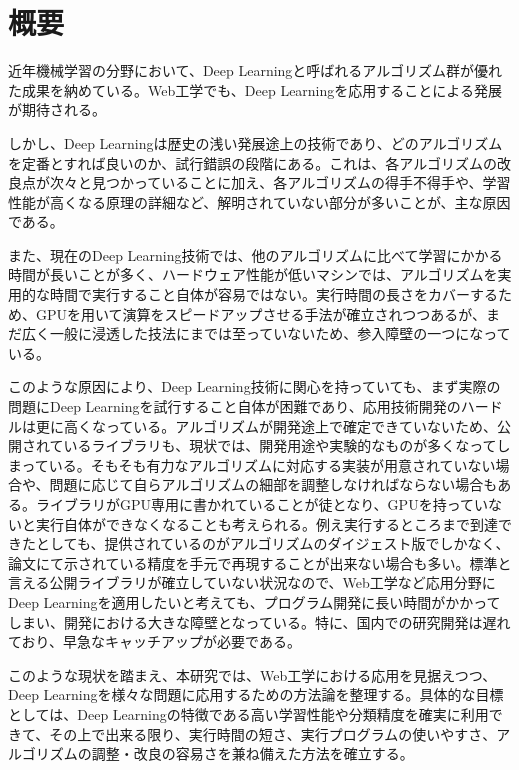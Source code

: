 \chapter*{概要}
近年機械学習の分野において、Deep Learningと呼ばれるアルゴリズム群が優れた成果を納めている。Web工学でも、Deep Learningを応用することによる発展が期待される。\par
しかし、Deep Learningは歴史の浅い発展途上の技術であり、どのアルゴリズムを定番とすれば良いのか、試行錯誤の段階にある。これは、各アルゴリズムの改良点が次々と見つかっていることに加え、各アルゴリズムの得手不得手や、学習性能が高くなる原理の詳細など、解明されていない部分が多いことが、主な原因である。\par
また、現在のDeep Learning技術では、他のアルゴリズムに比べて学習にかかる時間が長いことが多く、ハードウェア性能が低いマシンでは、アルゴリズムを実用的な時間で実行すること自体が容易ではない。実行時間の長さをカバーするため、GPUを用いて演算をスピードアップさせる手法が確立されつつあるが、まだ広く一般に浸透した技法にまでは至っていないため、参入障壁の一つになっている。\par
このような原因により、Deep Learning技術に関心を持っていても、まず実際の問題にDeep Learningを試行すること自体が困難であり、応用技術開発のハードルは更に高くなっている。アルゴリズムが開発途上で確定できていないため、公開されているライブラリも、現状では、開発用途や実験的なものが多くなってしまっている。そもそも有力なアルゴリズムに対応する実装が用意されていない場合や、問題に応じて自らアルゴリズムの細部を調整しなければならない場合もある。ライブラリがGPU専用に書かれていることが徒となり、GPUを持っていないと実行自体ができなくなることも考えられる。例え実行するところまで到達できたとしても、提供されているのがアルゴリズムのダイジェスト版でしかなく、論文にて示されている精度を手元で再現することが出来ない場合も多い。標準と言える公開ライブラリが確立していない状況なので、Web工学など応用分野にDeep Learningを適用したいと考えても、プログラム開発に長い時間がかかってしまい、開発における大きな障壁となっている。特に、国内での研究開発は遅れており、早急なキャッチアップが必要である。\par
このような現状を踏まえ、本研究では、Web工学における応用を見据えつつ、Deep Learningを様々な問題に応用するための方法論を整理する。具体的な目標としては、Deep Learningの特徴である高い学習性能や分類精度を確実に利用できて、その上で出来る限り、実行時間の短さ、実行プログラムの使いやすさ、アルゴリズムの調整・改良の容易さを兼ね備えた方法を確立する。

